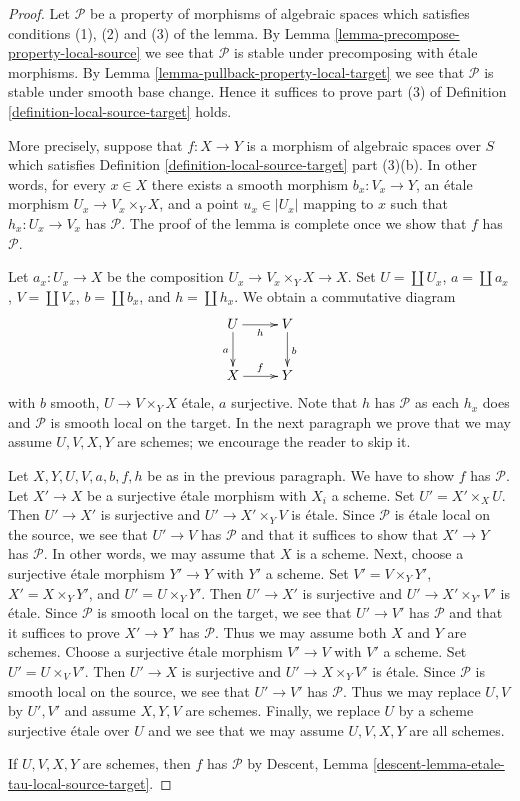 \documentclass{stacks-project}
\theoremstyle{plain}
\theoremstyle{definition}
\theoremstyle{remark}
\numberwithin{equation}{subsection}
\begin{document}
\begin{proof}
Let $\mathcal{P}$ be a property of morphisms of algebraic spaces which
satisfies conditions (1), (2) and (3) of the lemma. By
Lemma \ref{lemma-precompose-property-local-source}
we see that $\mathcal{P}$ is stable under precomposing with
\'etale morphisms. By
Lemma \ref{lemma-pullback-property-local-target}
we see that $\mathcal{P}$ is stable under smooth base change.
Hence it suffices to prove part (3) of
Definition \ref{definition-local-source-target}
holds.

\medskip\noindent
More precisely, suppose that $f : X \to Y$ is a morphism
of algebraic spaces over $S$ which satisfies
Definition \ref{definition-local-source-target} part (3)(b).
In other words, for every $x \in X$ there exists
a smooth morphism $b_x : V_x \to Y$,
an \'etale morphism $U_x \to V_x \times_Y X$, and
a point $u_x \in |U_x|$ mapping to $x$
such that $h_x : U_x \to V_x$ has $\mathcal{P}$.
The proof of the lemma is complete once we show that $f$ has $\mathcal{P}$.

\medskip\noindent
Let $a_x : U_x \to X$ be the composition $U_x \to V_x \times_Y X \to X$.
Set $U = \coprod U_x$, $a = \coprod a_x$, $V = \coprod V_x$,
$b = \coprod b_x$, and $h = \coprod h_x$. We obtain a
commutative diagram
$$
\xymatrix{
U \ar[d]_a \ar[r]_h & V \ar[d]^b \\
X \ar[r]^f & Y
}
$$
with $b$ smooth, $U \to V \times_Y X$ \'etale, $a$ surjective.
Note that $h$ has $\mathcal{P}$ as each $h_x$ does and $\mathcal{P}$
is smooth local on the target. In the next paragraph we prove
that we may assume $U, V, X, Y$ are schemes; we encourage the reader
to skip it.

\medskip\noindent
Let $X, Y, U, V, a, b, f, h$ be as in the previous paragraph. We have
to show $f$ has $\mathcal{P}$. Let $X' \to X$ be a surjective \'etale
morphism with $X_i$ a scheme. Set $U' = X' \times_X U$. Then
$U' \to X'$ is surjective and $U' \to X' \times_Y V$ is \'etale.
Since $\mathcal{P}$ is \'etale local on the source, we see that
$U' \to V$ has $\mathcal{P}$ and that it suffices to show that
$X' \to Y$ has $\mathcal{P}$. In other words, we may assume
that $X$ is a scheme. Next, choose a surjective \'etale morphism
$Y' \to Y$ with $Y'$ a scheme. Set $V' = V \times_Y Y'$,
$X' = X \times_Y Y'$, and $U' = U \times_Y Y'$. Then
$U' \to X'$ is surjective and $U' \to X' \times_{Y'} V'$ is \'etale.
Since $\mathcal{P}$ is smooth local on the target, we see that $U' \to V'$ has
$\mathcal{P}$ and that it suffices to prove $X' \to Y'$ has $\mathcal{P}$.
Thus we may assume both $X$ and $Y$ are schemes.
Choose a surjective \'etale morphism $V' \to V$
with $V'$ a scheme. Set $U' = U \times_V V'$.
Then $U' \to X$ is surjective and $U' \to X \times_Y V'$ is \'etale.
Since $\mathcal{P}$ is smooth local on the source, we see that
$U' \to V'$ has $\mathcal{P}$. Thus we may replace $U, V$ by
$U', V'$ and assume $X, Y, V$ are schemes.
Finally, we replace $U$ by a scheme surjective \'etale over $U$
and we see that we may assume $U, V, X, Y$ are all schemes.

\medskip\noindent
If $U, V, X, Y$ are schemes, then $f$ has $\mathcal{P}$
by Descent, Lemma \ref{descent-lemma-etale-tau-local-source-target}.
\end{proof}
\end{document}
